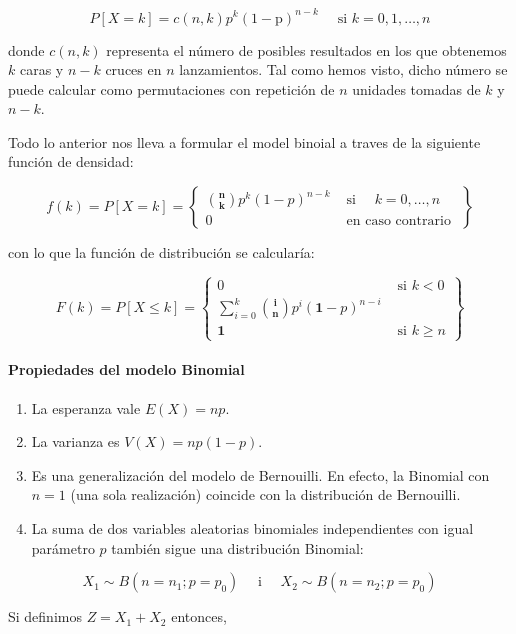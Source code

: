 \documentclass[
]{article}
\providecommand{\tightlist}{%
  \setlength{\itemsep}{0pt}\setlength{\parskip}{0pt}}
\begin{document}
\[
P[X=k]=c(n, k) p^{k}(1-\mathrm{p})^{n-k} \quad \text { si } k=0,1, \ldots, n
\]

donde \(c(n, k)\) representa el número de posibles resultados en los que obtenemos \(k\) caras y \(n-k\) cruces en \(n\) lanzamientos. Tal como hemos visto, dicho número se puede calcular como permutaciones con repetición de \(n\) unidades tomadas de \(k\) y \(n-k\).

Todo lo anterior nos lleva a formular el model binoial a traves de la siguiente función de densidad:

\[
f(k)=P[X=k]=\left\{\begin{array}{ll}
\binom{\mathbf{n}}{\mathbf{k}} p^{k}(1-p)^{n-k} & \text { si } \quad k=0, \ldots, n \\
0 & \text { en caso contrario }
\end{array}\right\}
\]

con lo que la función de distribución se calcularía:

\[
F(k)=P[X \leq k]=\left\{\begin{array}{cc}
0 & \text { si } k<0 \\
\sum_{i=0}^{k}\binom{\mathbf{i}}{\mathbf{n}} p^{i}(\mathbf{1}-p)^{n-i} \\
\mathbf{1} & \text { si } k \geq n
\end{array}\right\}
\]

\paragraph{Propiedades del modelo Binomial}\label{propiedades-del-modelo-binomial}

\begin{enumerate}
\def\labelenumi{\arabic{enumi}.}
\tightlist
\item
  La esperanza vale \(E(X)=n p\).
\item
  La varianza es \(V(X)=n p(1-p)\).
\item
  Es una generalización del modelo de Bernouilli. En efecto, la Binomial con \(n=1\) (una sola realización) coincide con la distribución de Bernouilli.
\item
  La suma de dos variables aleatorias binomiales independientes con igual parámetro \(p\) también sigue una distribución Binomial:
\end{enumerate}

\[
X_{1} \sim B\left(n=n_{1} ; p=p_{0}\right) \quad \text { i } \quad X_{2} \sim B\left(n=n_{2} ; p=p_{0}\right)
\]

Si definimos \(Z=X_{1}+X_{2}\) entonces,
\end{document}
